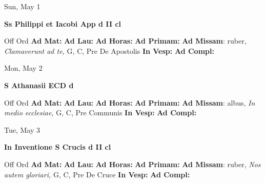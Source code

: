 \documentclass[10pt]{memoir}
\begin{document}
\begin{center}
\begin{minipage}{3.5in}
\vspace{2em}
\begin{center}Sun, May 1
\end{center}
\textbf{ \large Ss Philippi et Iacobi App
\textnormal{\normalsize d II cl}}

\begin{justify}Off Ord
\textbf{Ad Mat: }
\textbf{Ad Lau: }
\textbf{Ad Horas: }
\textbf{Ad Primam: }\textbf{Ad Missam}: ruber, \textit{Clamaverunt ad te,} G, C, Pre De Apostolis
\textbf{In Vesp: }
\textbf{Ad Compl: }
\end{justify}
\end{minipage}
\end{center}

\begin{center}
\begin{minipage}{3.5in}
\vspace{2em}
\begin{center}Mon, May 2
\end{center}
\textbf{ \large S Athanasii ECD
\textnormal{\normalsize d}}

\begin{justify}Off Ord
\textbf{Ad Mat: }
\textbf{Ad Lau: }
\textbf{Ad Horas: }
\textbf{Ad Primam: }\textbf{Ad Missam}: albus, \textit{In medio ecclesiae,} G, C, Pre Communis
\textbf{In Vesp: }
\textbf{Ad Compl: }
\end{justify}
\end{minipage}
\end{center}

\begin{center}
\begin{minipage}{3.5in}
\vspace{2em}
\begin{center}Tue, May 3
\end{center}
\textbf{ \large In Inventione S Crucis
\textnormal{\normalsize d II cl}}

\begin{justify}Off Ord
\textbf{Ad Mat: }
\textbf{Ad Lau: }
\textbf{Ad Horas: }
\textbf{Ad Primam: }\textbf{Ad Missam}: ruber, \textit{Nos autem gloriari,} G, C, Pre De Cruce
\textbf{In Vesp: }
\textbf{Ad Compl: }
\end{justify}
\end{minipage}
\end{center}
\end{document}
